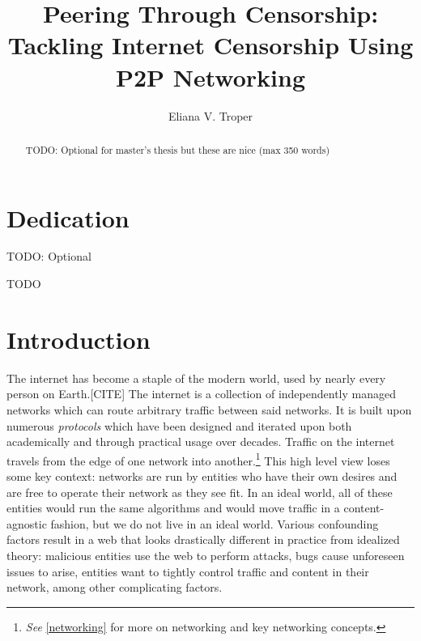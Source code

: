 \documentclass[12pt]{report}
\title{Peering Through Censorship:\\Tackling Internet Censorship Using P2P Networking}
\author{Eliana V. Troper}
\begin{document}

\maketitle    %

\begin{abstract}
TODO: Optional for master's thesis but these are nice (max 350 words)
\end{abstract}


\chapter*{Dedication}

TODO: Optional


TODO

\tableofcontents

\listoffigures  %
\listoftables   %

\newpage


\chapter{Introduction}

The internet has become a staple of the modern world, used by nearly every person on Earth.[CITE] The internet is a collection of independently managed networks which can route arbitrary traffic between said networks. It is built upon numerous \emph{protocols} which have been designed and iterated upon both academically and through practical usage over decades. Traffic on the internet travels from the edge of one network into another.\footnote{\emph{See} \ref{networking} for more on networking and key networking concepts.} This high level view loses some key context: networks are run by entities who have their own desires and are free to operate their network as they see fit. In an ideal world, all of these entities would run the same algorithms and would move traffic in a content-agnostic fashion, but we do not live in an ideal world. Various confounding factors result in a web that looks drastically different in practice from idealized theory: malicious entities use the web to perform attacks, bugs cause unforeseen issues to arise, entities want to tightly control traffic and content in their network, among other complicating factors.
\end{document}
